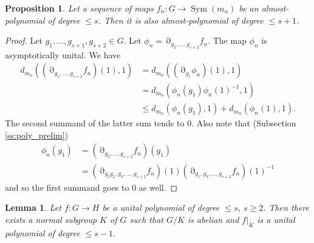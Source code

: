 \documentclass[a4paper,12pt]{amsart}
\theoremstyle{plain}
\newtheorem{proposition}[subsection]{{\bf Proposition}}
\newtheorem{lemma}[subsection]{{\bf Lemma}}
\theoremstyle{definition}
\theoremstyle{remark}
\numberwithin{equation}{subsection}
\DeclareMathOperator{\Sym}{Sym}
\DeclareMathOperator{\mypartial}{\partial}
\begin{document}
\begin{proposition}
    \label{prop:degreeup}
    Let a sequence of maps $f_n:G\to\Sym(m_n)$ be an almost-polynomial of degree $\le s$. Then it is also almost-polynomial of degree $\le s+1$.
\end{proposition}

\begin{proof}
    Let $g_1,\ldots ,g_{s+1},g_{s+2}\in G$. Let $\phi_n=\mypartial_{g_2,\ldots ,g_{s+2}}f_n$. The map $\phi_n$ is asymptotically unital. We have 
    \begin{align*}
        d_{m_n}((\mypartial_{g_1,\ldots ,g_{s+2}}f_n)(1),1)
        &= 
        d_{m_n}((\mypartial_{g_1}\phi_n)(1),1)\\
        &= d_{m_n}(\phi_n(g_1)\phi_n(1)^{-1},1)\\
        &\le d_{m_n}(\phi_n(g_1),1)+d_{m_n}(\phi_n(1),1).
    \end{align*}
    The second summand of the latter sum tends to $0$. Also note that (Subsection \ref{ss:poly_prelim})
    \begin{align*}
        \phi_n(g_1) &= (\mypartial_{g_2,\ldots ,g_{s+2}}f_n)(g_1)\\
        &= (\mypartial_{g_2g_1,g_3,\ldots ,g_{s+2}}f_n)(1)
        (\mypartial_{g_1,g_3,\ldots ,g_{s+2}}f_n)(1)^{-1}
    \end{align*}
    and so the first summand goes to $0$ as well.
\end{proof}

\begin{lemma}
    \label{lem:lowerdeg}
    Let $f:G\to H$ be a unital polynomial of degree $\le s$, $s\ge 2$. Then there exists a normal subgroup $K$ of $G$ such that $G/K$ is abelian and $f\big|_K$ is a unital polynomial of degree $\le s-1$.
\end{lemma}
\end{document}
